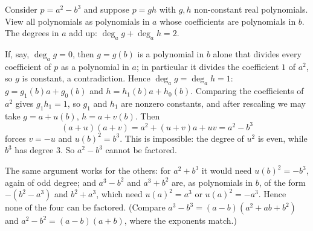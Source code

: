 Consider $p=a^2-b^3$ and suppose $p=gh$ with $g,h$ non-constant real polynomials. View all polynomials as polynomials in $a$ whose coefficients are polynomials in $b$. The degrees in $a$ add up: $\deg_a g+\deg_a h=2$.

If, say, $\deg_a g=0$, then $g=g(b)$ is a polynomial in $b$ alone that divides every coefficient of $p$ as a polynomial in $a$; in particular it divides the coefficient $1$ of $a^2$, so $g$ is constant, a contradiction. Hence $\deg_a g=\deg_a h=1$: $g=g_1(b)a+g_0(b)$ and $h=h_1(b)a+h_0(b)$. Comparing the coefficients of $a^2$ gives $g_1h_1=1$, so $g_1$ and $h_1$ are nonzero constants, and after rescaling we may take $g=a+u(b)$, $h=a+v(b)$. Then
\[
(a+u)(a+v)=a^2+(u+v)a+uv=a^2-b^3
\]
forces $v=-u$ and $u(b)^2=b^3$. This is impossible: the degree of $u^2$ is even, while $b^3$ has degree $3$. So $a^2-b^3$ cannot be factored.

The same argument works for the others: for $a^2+b^3$ it would need $u(b)^2=-b^3$, again of odd degree; and $a^3-b^2$ and $a^3+b^2$ are, as polynomials in $b$, of the form $-(b^2-a^3)$ and $b^2+a^3$, which need $u(a)^2=a^3$ or $u(a)^2=-a^3$. Hence $\boxed{\text{none of the four can be factored}}$. (Compare $a^3-b^3=(a-b)\left(a^2+ab+b^2\right)$ and $a^2-b^2=(a-b)(a+b)$, where the exponents match.)
